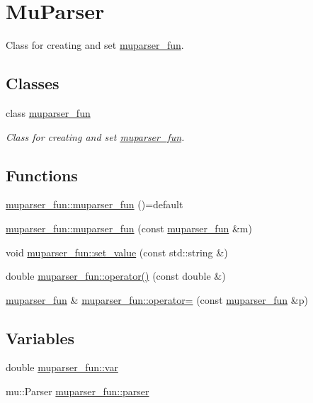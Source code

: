 \hypertarget{group__MuParser}{}\section{Mu\+Parser}
\label{group__MuParser}


Class for creating and set \hyperlink{classmuparser__fun}{muparser\+\_\+fun}.  


\subsection*{Classes}
\begin{DoxyCompactItemize}
\item 
class \hyperlink{classmuparser__fun}{muparser\+\_\+fun}
\begin{DoxyCompactList}\small\item\em Class for creating and set \hyperlink{classmuparser__fun}{muparser\+\_\+fun}. \end{DoxyCompactList}\end{DoxyCompactItemize}
\subsection*{Functions}
\begin{DoxyCompactItemize}
\item 
\hyperlink{group__MuParser_ga17c98796657ea4da75ca6e273f0b6965}{muparser\+\_\+fun\+::muparser\+\_\+fun} ()=default
\item 
\hyperlink{group__MuParser_ga106b21c0b17eb9fbc347fd510f617efb}{muparser\+\_\+fun\+::muparser\+\_\+fun} (const \hyperlink{classmuparser__fun}{muparser\+\_\+fun} \&m)
\item 
void \hyperlink{group__MuParser_ga1e7855a7285191f81deddf262cac949a}{muparser\+\_\+fun\+::set\+\_\+value} (const std\+::string \&)
\item 
double \hyperlink{group__MuParser_gad6ad244f299a60774735832c4ea28d66}{muparser\+\_\+fun\+::operator()} (const double \&)
\item 
\hyperlink{classmuparser__fun}{muparser\+\_\+fun} \& \hyperlink{group__MuParser_ga6e4082f4ba40e947b734195a337823d9}{muparser\+\_\+fun\+::operator=} (const \hyperlink{classmuparser__fun}{muparser\+\_\+fun} \&p)
\end{DoxyCompactItemize}
\subsection*{Variables}
\begin{DoxyCompactItemize}
\item 
double \hyperlink{group__MuParser_gac4fe6d4c1437a4f66039268cdd304b75}{muparser\+\_\+fun\+::var}
\item 
mu\+::\+Parser \hyperlink{group__MuParser_gad94fb029c66d186b6fe278b51df8dfc4}{muparser\+\_\+fun\+::parser}
\end{DoxyCompactItemize}


